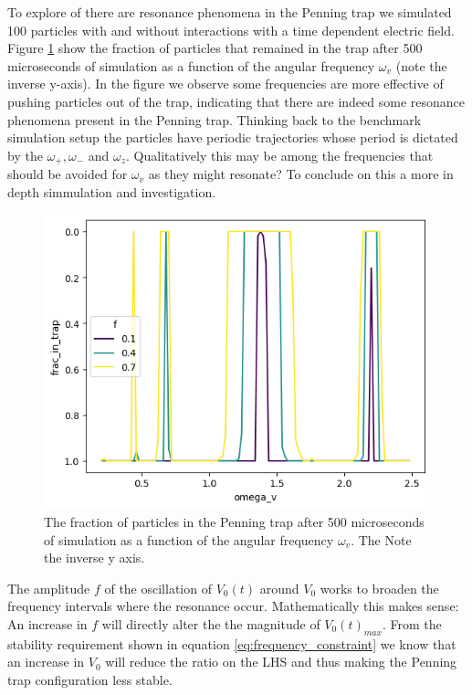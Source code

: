 \documentclass[../main_proj3.tex]{subfiles}
\begin{document}
To explore of there are resonance phenomena in the Penning trap we simulated 100 particles with and without interactions with a time dependent electric field. Figure \ref{fig:100_full_omega_v} show the fraction of particles that remained in the trap after 500 microseconds of simulation as a function of the angular frequency $\omega_v$ (note the inverse y-axis). In the figure we observe some frequencies are more effective of pushing particles out of the trap, indicating that there are indeed some resonance phenomena present in the Penning trap. Thinking back to the benchmark simulation setup the particles have periodic trajectories whose period is dictated by the $\omega_+, \omega_-$ and $\omega_z$. Qualitatively this may be among the frequencies that should be avoided for $\omega_v$ as they might resonate? To conclude on this a more in depth simmulation and investigation. 

\begin{figure}[h!]
    \centering
    \includegraphics[width=0.9\linewidth]{Project 3/figures/100_particle_full_fq.png}
    \caption{The fraction of particles in the Penning trap after 500 microseconds of simulation as a function of the angular frequency $\omega_v$. The Note the inverse y axis.}
    \label{fig:100_full_omega_v}
\end{figure}

The amplitude $f$ of the oscillation of $V_0(t)$ around $V_0$ works to broaden the frequency intervals where the resonance occur. Mathematically this makes sense: An increase in $f$ will directly alter the the magnitude of $V_0(t)_{max}$. From the stability requirement shown in equation \eqref{eq:frequency_constraint} we know that an increase in $V_0$ will reduce the ratio on the LHS and thus making the Penning trap configuration less stable. 
\end{document}
